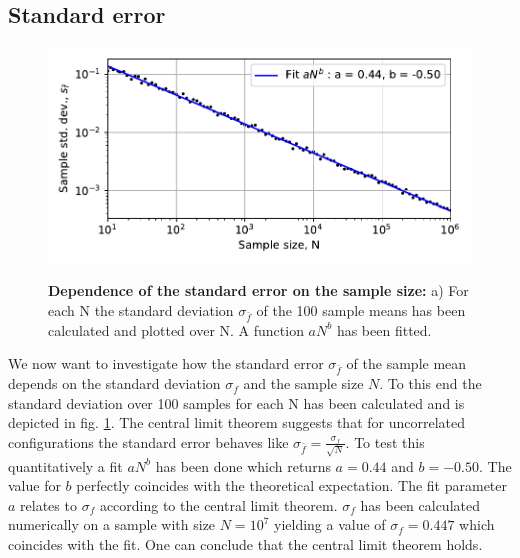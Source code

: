 \documentclass[11pt, a4paper]{article}
\begin{document}
    \subsection{Standard error}
        \begin{figure}
            \includegraphics{fig2.pdf}
            \label{fig2}
            \caption{\textbf{Dependence of the standard error on the sample size:} a) For each N the standard deviation $\sigma_\bar{f}$ of the 100 sample means has been calculated and plotted over N. A function $aN^b$ has been fitted.}
        \end{figure}
        We now want to investigate how the standard error $\sigma_\bar{f}$ of the sample mean depends on the standard deviation $\sigma_f$ and the sample size $N$. To this end the standard deviation over 100 samples for each N has been calculated and is depicted in fig. \ref{fig2}. The central limit theorem suggests that for uncorrelated configurations the standard error behaves like $\sigma_{\bar{f}} = \frac{\sigma_f}{\sqrt{N}}$. To test this quantitatively a fit $aN^b$ has been done which returns $a = 0.44$ and $b = -0.50$. The value for $b$ perfectly coincides with the theoretical expectation. The fit parameter $a$ relates to $\sigma_f$ according to the central limit theorem. $\sigma_f$ has been calculated numerically on a sample with size $N = 10^7$ yielding a value of $\sigma_f = 0.447$ which coincides with the fit. One can conclude that the central limit theorem holds.
\end{document}
